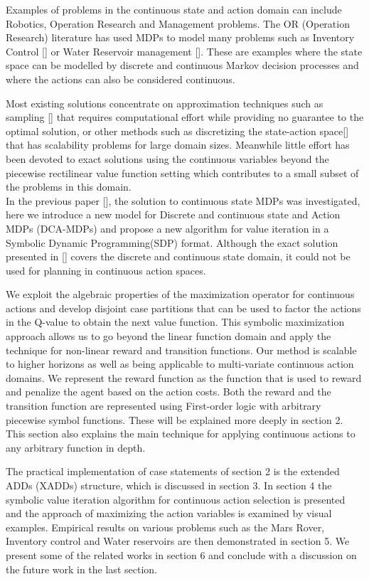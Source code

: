 \documentclass[letterpaper]{article}
\begin{document}
Examples of problems in the continuous state and action domain can include Robotics, Operation Research and Management problems. The OR (Operation Research) literature has used MDPs to model many problems such as Inventory Control [] or Water Reservoir management []. These are examples where the state space can be modelled by discrete and continuous Markov decision processes and where the actions can also be considered continuous.

Most existing solutions concentrate on approximation techniques such as sampling [] that requires computational effort while providing no guarantee to the optimal solution, or other methods such as discretizing the state-action space[] that has scalability problems for large domain sizes. Meanwhile little effort has been devoted to exact solutions using the continuous variables beyond the piecewise rectilinear value function setting which contributes to a small subset of the problems in this domain. \\
In the previous paper [], the solution to continuous state MDPs was investigated, here we introduce a new model for Discrete and continuous state and Action MDPs (DCA-MDPs) and propose a new algorithm for value iteration in a Symbolic Dynamic Programming(SDP) format. Although the exact solution presented in [] covers the discrete and continuous state domain, it could not be used for planning in continuous action spaces. 

We exploit the algebraic properties of the maximization operator for continuous actions and develop disjoint case partitions that can be used to factor the actions in the Q-value to obtain the next value function. This symbolic maximization approach allows us to go beyond the linear function domain and apply the technique for non-linear reward and transition functions. Our method is scalable to higher horizons as well as being applicable to multi-variate continuous action domains. We represent the reward function as the function that is used to reward and penalize the agent based on the action costs. Both the reward and the transition function are represented using First-order logic with arbitrary piecewise symbol functions. These will be explained more deeply in section 2. This section also explains the main technique for applying continuous actions to any arbitrary function in depth. 

The practical implementation of case statements of section 2 is the extended ADDs (XADDs) structure, which is discussed in section 3. In section 4 the symbolic value iteration algorithm for continuous action selection is presented and the approach of maximizing the action variables is examined by visual examples. Empirical results on various problems such as the Mars Rover, Inventory control and Water reservoirs are then demonstrated in section 5. We present some of the related works in section 6 and conclude with a discussion on the future work in the last section. 
\end{document}
